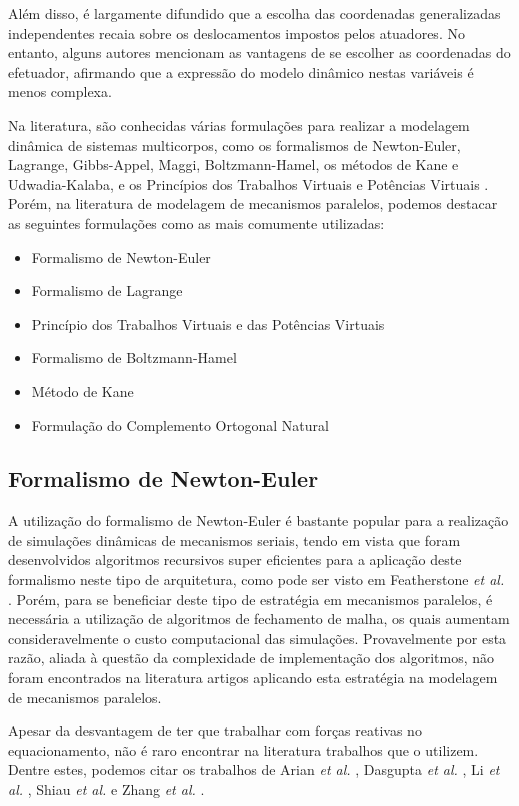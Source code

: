 \documentclass[]{politex}
\begin{document}
Além disso, é largamente difundido que a escolha das coordenadas generalizadas independentes recaia sobre os deslocamentos impostos pelos atuadores. No entanto, alguns autores \cite{Li, Khalil2} mencionam as vantagens de se escolher as coordenadas do efetuador, afirmando que a expressão do modelo dinâmico nestas variáveis é menos complexa.

Na literatura, são conhecidas várias formulações para realizar a modelagem dinâmica de sistemas multicorpos, como os formalismos de Newton-Euler, Lagrange, Gibbs-Appel, Maggi, Boltzmann-Hamel, os métodos de Kane e Udwadia-Kalaba, e os Princípios dos Trabalhos Virtuais e Potências Virtuais \cite{23orsino}. Porém, na literatura de modelagem de mecanismos paralelos, podemos destacar as seguintes formulações como as mais comumente utilizadas:

\begin{itemize}
\item Formalismo de Newton-Euler
\item Formalismo de Lagrange
\item Princípio dos Trabalhos Virtuais e das Potências Virtuais
\item Formalismo de Boltzmann-Hamel
\item Método de Kane
\item Formulação do Complemento Ortogonal Natural
\end{itemize}

\subsection{Formalismo de Newton-Euler}

A utilização do formalismo de Newton-Euler é bastante popular para a realização de simulações dinâmicas de mecanismos seriais, tendo em vista que foram desenvolvidos algoritmos recursivos super eficientes para a aplicação deste formalismo neste tipo de arquitetura, como pode ser visto em Featherstone \emph{et al.} \cite{Featherstone}. Porém, para se beneficiar deste tipo de estratégia em mecanismos paralelos, é necessária a utilização de algoritmos de fechamento de malha, os quais aumentam consideravelmente o custo computacional das simulações. Provavelmente por esta razão, aliada à questão da complexidade de implementação dos algoritmos, não foram encontrados na literatura artigos aplicando esta estratégia na modelagem de mecanismos paralelos. 

Apesar da desvantagem de ter que trabalhar com forças reativas no equacionamento, não é raro encontrar na literatura trabalhos que o utilizem. Dentre estes, podemos citar os trabalhos de Arian \emph{et al.} \cite{Arian}, Dasgupta \emph{et al.} \cite{Dasgupta}, Li \emph{et al.} \cite{LiWang}, Shiau \emph{et al.} \cite{Shiau} e Zhang \emph{et al.} \cite{Zhang}.
\end{document}
